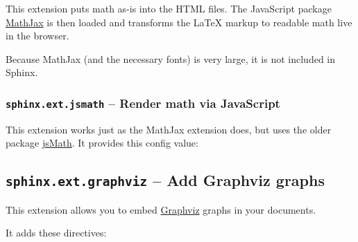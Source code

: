 \documentclass[letterpaper,10pt,english]{sphinxmanual}
\begin{document}
This extension puts math as-is into the HTML files.  The JavaScript package
\href{http://www.mathjax.org/}{MathJax} is then loaded and transforms the LaTeX markup to readable math live in
the browser.

Because MathJax (and the necessary fonts) is very large, it is not included in
Sphinx.


\subsubsection{\texttt{sphinx.ext.jsmath} -- Render math via JavaScript}
\label{ext/math:sphinx-ext-jsmath-render-math-via-javascript}\label{ext/math:module-sphinx.ext.jsmath}
This extension works just as the MathJax extension does, but uses the older
package \href{http://www.math.union.edu/~dpvc/jsmath/}{jsMath}.  It provides this config value:


\subsection{\texttt{sphinx.ext.graphviz} -- Add Graphviz graphs}
\label{ext/graphviz:sphinx-ext-graphviz-add-graphviz-graphs}\label{ext/graphviz:amsmath-latex-package}\label{ext/graphviz:module-sphinx.ext.graphviz}\label{ext/graphviz::doc}

This extension allows you to embed \href{http://graphviz.org/}{Graphviz} graphs in
your documents.

It adds these directives:
\end{document}
